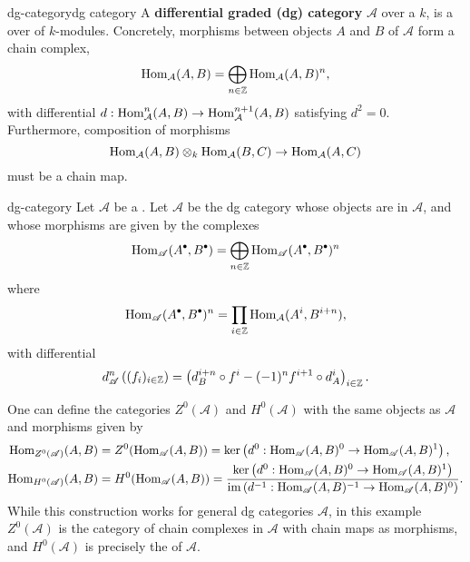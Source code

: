 \begin{topic}{dg-category}{dg category}
    A \textbf{differential graded (dg) category} $\mathcal{A}$ over a  $k$, is a   over  of $k$-modules. Concretely, morphisms between objects $A$ and $B$ of $\mathcal{A}$ form a chain complex,
    \[ \text{Hom}_\mathcal{A}(A, B) = \bigoplus_{n \in \mathbb{Z}} \text{Hom}_\mathcal{A}(A, B)^n , \]
    with differential $d : \text{Hom}^n_\mathcal{A}(A, B) \to \text{Hom}^{n + 1}_\mathcal{A}(A, B)$ satisfying $d^2 = 0$. Furthermore, composition of morphisms
    \[ \text{Hom}_\mathcal{A}(A, B) \otimes_k \text{Hom}_\mathcal{A}(B, C) \to \text{Hom}_\mathcal{A}(A, C) \]
    must be a chain map.
\end{topic}

\begin{example}{dg-category}
    Let $\mathcal{A}$ be a . Let $\mathscr{A}$ be the dg category whose objects are  in $\mathcal{A}$, and whose morphisms are given by the complexes
    \[ \Hom_\mathscr{A}(A^\bdot, B^\bdot) = \bigoplus_{n \in \ZZ} \Hom_\mathscr{A}(A^\bdot, B^\bdot)^n \]
    where
    \[ \Hom_\mathscr{A}(A^\bdot, B^\bdot)^n = \prod_{i \in \ZZ} \Hom_\mathcal{A}(A^i, B^{i + n}) , \]
    with differential
    \[ d_\mathscr{A}^n \left( (f_i)_{i \in \mathbb{Z}} \right) = \left( d_B^{i + n} \circ f^i - (-1)^n f^{i + 1} \circ d_A^i \right)_{i \in \mathbb{Z}} . \]
    
    One can define the categories $Z^0(\mathscr{A})$ and $H^0(\mathscr{A})$ with the same objects as $\mathscr{A}$ and morphisms given by
    \[ \begin{aligned}
        \text{Hom}_{Z^0(\mathscr{A})}(A, B) &= Z^0(\text{Hom}_\mathscr{A}(A, B)) = \ker \left(d^0 : \text{Hom}_\mathscr{A}(A, B)^0 \to \text{Hom}_\mathscr{A}(A, B)^1 \right) , \\
        \text{Hom}_{H^0(\mathscr{A})}(A, B) &= H^0(\text{Hom}_\mathscr{A}(A, B)) = \frac{\ker \left(d^0 : \text{Hom}_\mathscr{A}(A, B)^0 \to \text{Hom}_\mathscr{A}(A, B)^1 \right)}{\operatorname{im} \left(d^{-1} : \text{Hom}_\mathscr{A}(A, B)^{-1} \to \text{Hom}_\mathscr{A}(A, B)^{0} \right)} .
    \end{aligned} \]
    While this construction works for general dg categories $\mathscr{A}$, in this example $Z^0(\mathscr{A})$ is the category of chain complexes in $\mathcal{A}$ with chain maps as morphisms, and $H^0(\mathscr{A})$ is precisely the  of $\mathcal{A}$.
\end{example}

